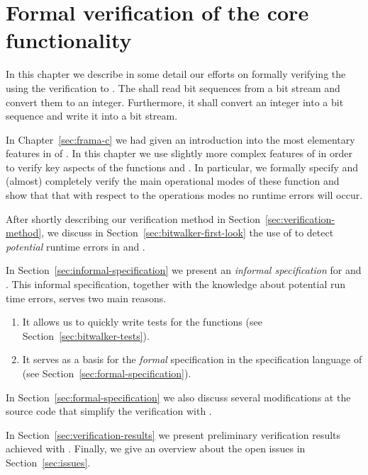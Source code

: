 
\chapter{Formal verification of the \bitwalker core functionality}
\label{sec:formal-verification}


In this chapter we describe in some detail
our efforts on formally verifying the \bitwalker using the verification
to \framacwp.
The \bitwalker shall read bit sequences from a bit stream 
and convert them to an integer. Furthermore, it shall
convert an integer into a bit sequence and write it into a bit stream.

In Chapter~\ref{sec:frama-c} we had given an introduction
into the most elementary features in of \framacwp.
In this chapter we use slightly more complex features of \framacwp
in order to verify key aspects of the \bitwalker functions \peek and \poke.
In particular, we formally specify and (almost) completely verify the
main operational modes of these function and show that that
with respect to the operations modes no runtime errors will occur.

After shortly describing our verification method in Section~\ref{sec:verification-method},
we discuss in Section~\ref{sec:bitwalker-first-look}
the use of \framacwp to detect \emph{potential} runtime errors in \peek and \poke.

In Section~\ref{sec:informal-specification} we present an \emph{informal specification}
for \peek and \poke.
This informal specification, together with the knowledge about potential
run time errors, serves two main reasons.
\begin{enumerate}
\item  It allows us to quickly write tests for the \bitwalker functions 
       (see Section~\ref{sec:bitwalker-tests}).
\item It serves as a basis for the \emph{formal} specification in the \acsl
      specification language of \framacwp (see Section~\ref{sec:formal-specification}).
\end{enumerate}

In Section~\ref{sec:formal-specification} we also discuss several 
modifications at the source code that simplify the verification with \framacwp.

In Section~\ref{sec:verification-results} we present 
preliminary verification results achieved with \framacwp.
Finally, we give an overview about the open issues in Section~\ref{sec:issues}.

\clearpage

